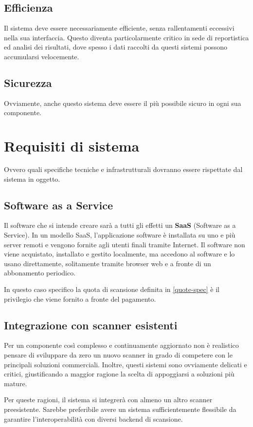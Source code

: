 \subsection{Efficienza}
Il sistema deve essere necessariamente efficiente, senza rallentamenti eccessivi nella sua interfaccia. Questo diventa particolarmente critico in sede di reportistica ed analisi dei risultati, dove spesso i dati raccolti da questi sistemi possono accumularsi velocemente.

\subsection{Sicurezza}
Ovviamente, anche questo sistema deve essere il più possibile sicuro in ogni sua componente.

\section{Requisiti di sistema}
Ovvero quali specifiche tecniche e infrastrutturali dovranno essere rispettate dal sistema in oggetto.

\subsection{Software as a Service}
\label{saas}
Il software che si intende creare sarà a tutti gli effetti un \textbf{SaaS} (Software as a Service). In un modello SaaS, l'applicazione software è installata su uno e più server remoti e vengono fornite agli utenti finali tramite Internet. Il software non viene acquistato, installato e gestito localmente, ma accedono al software e lo usano direttamente, solitamente tramite browser web e a fronte di un abbonamento periodico.

In questo caso specifico la quota di scansione definita in \ref{quote-spec} è il privilegio che viene fornito a fronte del pagamento.

\subsection{Integrazione con scanner esistenti}
Per un componente così complesso e continuamente aggiornato non è realistico pensare di sviluppare da zero un nuovo scanner in grado di competere con le principali soluzioni commerciali. Inoltre, questi sistemi sono ovviamente delicati e critici, giustificando a maggior ragione la scelta di appoggiarsi a soluzioni più mature.

Per queste ragioni, il sistema si integrerà con almeno un altro scanner preesistente. Sarebbe preferibile avere un sistema sufficientemente flessibile da garantire l'interoperabilità con diversi backend di scansione.

